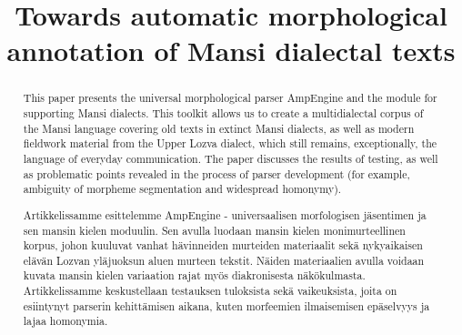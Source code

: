 \documentclass[b5paper,notitlepage]{article}
\newif\ifcameraready
\begin{document}
\ifcameraready
\pagestyle{empty}
\fi

\title{Towards automatic morphological annotation of Mansi dialectal texts
}

\ifcameraready
\author{
    Fyodor Sizov\textsuperscript{1},
    Daria Zhornik\textsuperscript{2},
    Sophie Pokrovskaya\textsuperscript{2},
    Vladimir Plungian\textsuperscript{1}\\
    \textsuperscript{1}
    Institute of Linguistics, Russian Academy of Sciences\\
    \url{f.sizov@yandex.ru}, \url{plungian@iling-ran.ru}\\
    \textsuperscript{2}
    Lomonosov Moscow State University\\
    \url{daria.zhornik@yandex.ru}, \url{sofie.v.pokrovskaya@gmail.com}
}
\fi

\date{}

\maketitle
\ifcameraready
\thispagestyle{empty}
\fi

\begin{abstract}
   This paper presents the universal morphological parser AmpEngine and the module for supporting  Mansi dialects. This toolkit allows us to create a multidialectal corpus of the Mansi language covering old texts in extinct Mansi dialects, as well as modern fieldwork material from the Upper Lozva dialect, which still remains, exceptionally, the language of everyday communication. 
   The paper discusses the results of testing, as well as problematic points revealed in the process of parser development (for example, ambiguity of morpheme segmentation and widespread homonymy).
\end{abstract}

{
\begin{abstract}
    Artikkelissamme esittelemme AmpEngine - universaalisen morfologisen jäsentimen ja sen mansin kielen moduulin. Sen avulla luodaan mansin kielen monimurteellinen korpus, johon kuuluvat vanhat hävinneiden murteiden materiaalit sekä nykyaikaisen elävän Lozvan yläjuoksun aluen murteen tekstit. Näiden materiaalien avulla voidaan kuvata mansin kielen variaation rajat myös diakronisesta näkökulmasta. Artikkelissamme keskustellaan testauksen tuloksista sekä vaikeuksista, joita on esiintynyt parserin kehittämisen aikana, kuten morfeemien ilmaisemisen epäselvyys ja lajaa homonymia.

\end{abstract}
}
\end{document}
